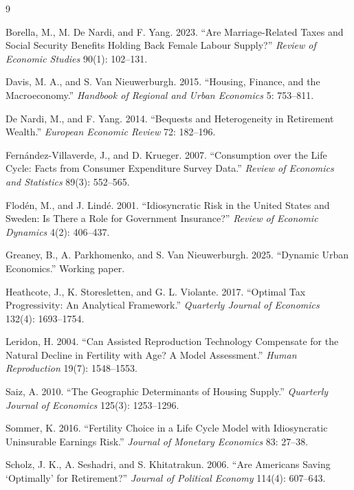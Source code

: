 \documentclass[11pt]{article}
\begin{document}
\begin{thebibliography}{9}

Borella, M., M. De Nardi, and F. Yang. 2023.
``Are Marriage-Related Taxes and Social Security Benefits Holding Back Female Labour Supply?''
\emph{Review of Economic Studies} 90(1): 102--131.

Davis, M. A., and S. Van Nieuwerburgh. 2015.
``Housing, Finance, and the Macroeconomy.''
\emph{Handbook of Regional and Urban Economics} 5: 753--811.

De Nardi, M., and F. Yang. 2014.
``Bequests and Heterogeneity in Retirement Wealth.''
\emph{European Economic Review} 72: 182--196.

Fern\'andez-Villaverde, J., and D. Krueger. 2007.
``Consumption over the Life Cycle: Facts from Consumer Expenditure Survey Data.''
\emph{Review of Economics and Statistics} 89(3): 552--565.

Flod\'en, M., and J. Lind\'e. 2001.
``Idiosyncratic Risk in the United States and Sweden: Is There a Role for Government Insurance?''
\emph{Review of Economic Dynamics} 4(2): 406--437.

Greaney, B., A. Parkhomenko, and S. Van Nieuwerburgh. 2025.
``Dynamic Urban Economics.'' Working paper.

Heathcote, J., K. Storesletten, and G. L. Violante. 2017.
``Optimal Tax Progressivity: An Analytical Framework.''
\emph{Quarterly Journal of Economics} 132(4): 1693--1754.

Leridon, H. 2004.
``Can Assisted Reproduction Technology Compensate for the Natural Decline in Fertility with Age? A Model Assessment.''
\emph{Human Reproduction} 19(7): 1548--1553.

Saiz, A. 2010.
``The Geographic Determinants of Housing Supply.''
\emph{Quarterly Journal of Economics} 125(3): 1253--1296.

Sommer, K. 2016.
``Fertility Choice in a Life Cycle Model with Idiosyncratic Uninsurable Earnings Risk.''
\emph{Journal of Monetary Economics} 83: 27--38.

Scholz, J. K., A. Seshadri, and S. Khitatrakun. 2006.
``Are Americans Saving `Optimally' for Retirement?''
\emph{Journal of Political Economy} 114(4): 607--643.

\end{thebibliography}
\end{document}

